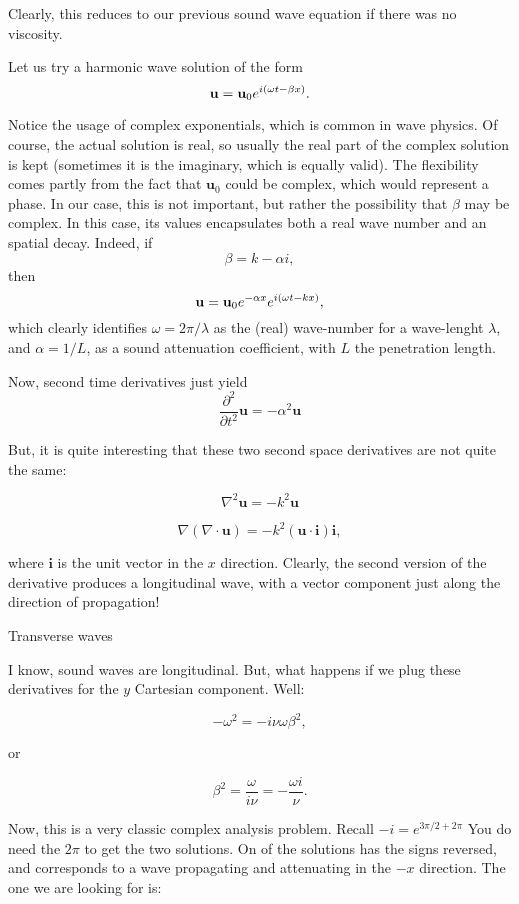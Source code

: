 Clearly, this reduces to our previous sound wave equation if there was
no viscosity.

Let us try a harmonic wave solution of the form
\[
  \mathbf{u} = \mathbf{u}_0 e^{i(\omega t - \beta x)} .
\]

Notice the usage of complex exponentials, which is common in wave
physics. Of course, the actual solution is real, so usually the real
part of the complex solution is kept (sometimes it is the imaginary,
which is equally valid). The flexibility comes partly from the fact
that $\mathbf{u}_0$ could be complex, which would represent a phase.
In our case, this is not important, but rather the possibility that
$\beta$ may be complex. In this case, its values encapsulates both a
real wave number and an spatial decay. Indeed, if
\[
  \beta = k - \alpha i ,
\]
then
\[
  \mathbf{u} = \mathbf{u}_0e^{- \alpha x} e^{i(\omega t - k x)} ,
\]
which clearly identifies $ \omega=2\pi /\lambda$ as the (real)
wave-number for a wave-lenght $ \lambda$, and $ \alpha=1 /L $, as a
sound attenuation coefficient, with $ L $ the penetration length.

Now, second time derivatives just yield
\[
  \frac{\partial^2  }{\partial t^2 } \mathbf{u} = -\alpha^2 \mathbf{u}
\]

But, it is quite interesting that these two second space derivatives
are not quite the same:

\[ \nabla^2 \mathbf{u} = -k^2 \mathbf{u}\]

\[ \nabla (\nabla\cdot \mathbf{u} ) = -k^2
(\mathbf{u}\cdot\mathbf{i})\mathbf{i} ,\]

where $ \mathbf{i} $ is the unit vector in the $x$ direction. Clearly,
the second version of the derivative produces a longitudinal wave,
with a vector component just along the direction of propagation!


Transverse waves


I know, sound waves are longitudinal. But, what happens if we plug
these derivatives for the $y$ Cartesian component. Well:

\[ -\omega^2 = - i \nu \omega \beta^2,\]

or

\[ \beta^2 = \frac{\omega}{i \nu} = - \frac{\omega i}{\nu} .\]

Now, this is a very classic complex analysis problem. Recall $
-i=e^{3\pi/2+2\pi} $ You do need the $ 2\pi$ to get the two
solutions. On of the solutions has the signs reversed, and corresponds
to a wave propagating and attenuating in the $-x$ direction. The one
we are looking for is:


